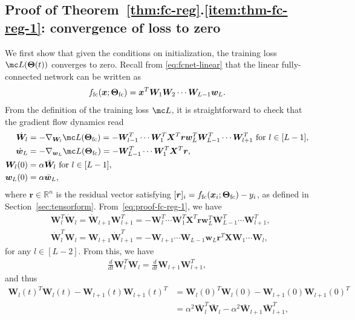 \documentclass{article} %
\def\vr{{\bm{r}}}
\def\vw{{\bm{w}}}
\def\vx{{\bm{x}}}
\def\mW{{\bm{W}}}
\def\mX{{\bm{X}}}
\newcommand{\R}{\mathbb{R}}
\newcommand{\bTheta}{\bm{\Theta}}
\newcommand{\bThetafc}{\bTheta_{\rm fc}}
\newcommand{\ffc}{f_{\rm fc}}
\begin{document}
\subsection{Proof of Theorem~\ref{thm:fc-reg}.\ref{item:thm-fc-reg-1}: convergence of loss to zero}
We first show that given the conditions on initialization, the training loss $\mc L(\bTheta(t))$ converges to zero.
Recall from \eqref{eq:fcnet-linear} that the linear fully-connected network can be written as
\begin{equation*}
    \ffc(\vx; \bThetafc) = \vx^T \mW_1 \mW_2 \cdots \mW_{L-1} \vw_L.
\end{equation*}
From the definition of the training loss $\mc L$, it is straightforward to check that the gradient flow dynamics read
\begin{equation}
\label{eq:proof-fc-reg-1}
\begin{aligned}
    \dot \mW_l &= - \nabla_{\mW_l} \mc L(\bThetafc) = - \mW_{l-1}^T \cdots \mW_1^T \mX^T \vr \vw_L^T \mW_{L-1}^T \cdots \mW_{l+1}^T \text { for } l \in [L-1],\\
    \dot \vw_L &= - \nabla_{\vw_L} \mc L(\bThetafc) = - \mW_{L-1}^T \cdots \mW_1^T \mX^T \vr,\\
    \mW_l(0) &= \alpha \bar \mW_l \text { for } l \in [L-1],\\
    \vw_L(0) &= \alpha \bar \vw_L,
\end{aligned}    
\end{equation}
where $\vr \in \R^n$ is the residual vector satisfying $[\vr]_i = \ffc(\vx_i;\bThetafc) - y_i$, as defined in Section~\ref{sec:tensorform}.
From~\eqref{eq:proof-fc-reg-1}, we have
\begin{align*}
    &\mW_l^T \dot \mW_l = \dot \mW_{l+1} \mW_{l+1}^T = - \mW_l^T \cdots \mW_1^T \mX^T \vr \vw_L^T \mW_{L-1}^T \cdots \mW_{l+1}^T,\\
    &\dot \mW_l^T \mW_l = \mW_{l+1} \dot \mW_{l+1}^T = - \mW_{l+1} \cdots \mW_{L-1} \vw_L \vr^T \mX \mW_1 \cdots \mW_l,
\end{align*}
for any $l \in [L-2]$. From this, we have
\begin{align*}
    \frac{d}{dt} \mW_l^T \mW_l = \frac{d}{dt} \mW_{l+1} \mW_{l+1}^T,
\end{align*}
and thus
\begin{equation}
\label{eq:proof-fc-reg-3}
\begin{aligned}
    \mW_l(t)^T \mW_l(t) - \mW_{l+1}(t) \mW_{l+1}(t)^T 
    &= \mW_l(0)^T \mW_l(0) - \mW_{l+1}(0) \mW_{l+1}(0)^T \\
    &= \alpha^2 \bar \mW_l^T \bar \mW_l - \alpha^2 \bar \mW_{l+1} \bar \mW_{l+1}^T,
\end{aligned}    
\end{equation}
\end{document}
